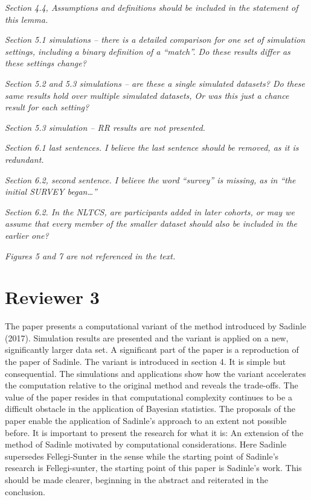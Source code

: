 \documentclass[letterpaper, parskip]{scrartcl}
\newcommand{\pointRaised}[1]{%
	\begin{tcolorbox}
		\itshape #1
	\end{tcolorbox}
}
\newcounter{responsectr}[section]     %
\begin{document}
		\pointRaised{%
Section 4.4, Assumptions and definitions should be included in the statement of this lemma.
}
		\pointRaised{%
Section 5.1 simulations – there is a detailed comparison for one set of simulation settings,
including a binary definition of a “match”. Do these results differ as these settings change?
}
		\pointRaised{%
Section 5.2 and 5.3 simulations – are these a single simulated datasets? Do these same results
hold over multiple simulated datasets, Or was this just a chance result for each setting?
}
		\pointRaised{%
Section 5.3 simulation – RR results are not presented.
}
		\pointRaised{%
	Section 6.1 last sentences. I believe the last sentence should be removed, as it is redundant.
}
		\pointRaised{%
Section 6.2, second sentence. I believe the word “survey” is missing, as in “the initial SURVEY
began…”
}
		\pointRaised{%
Section 6.2. In the NLTCS, are participants added in later cohorts, or may we assume that every
member of the smaller dataset should also be included in the earlier one?
}
		\pointRaised{%
	Figures 5 and 7 are not referenced in the text.
}



	\clearpage
	\newpage
	
	\section*{Reviewer 3}
	\setcounter{responsectr}{0}

	The paper presents a computational variant of the method introduced by Sadinle (2017). Simulation
	results are presented and the variant is applied on a new, significantly larger data set.
	A significant part of the paper is a reproduction of the paper of Sadinle. The variant is introduced in
	section 4. It is simple but consequential. The simulations and applications show how the variant
	accelerates the computation relative to the original method and reveals the trade-offs.
	The value of the paper resides in that computational complexity continues to be a difficult obstacle in
	the application of Bayesian statistics. The proposals of the paper enable the application of Sadinle’s
	approach to an extent not possible before.
	It is important to present the research for what it is: An extension of the method of Sadinle motivated
	by computational considerations. Here Sadinle supersedes Fellegi-Sunter in the sense while the starting
	point of Sadinle’s research is Fellegi-sunter, the starting point of this paper is Sadinle’s work. This should
	be made clearer, beginning in the abstract and reiterated in the conclusion.
	
	
	
\end{document}
